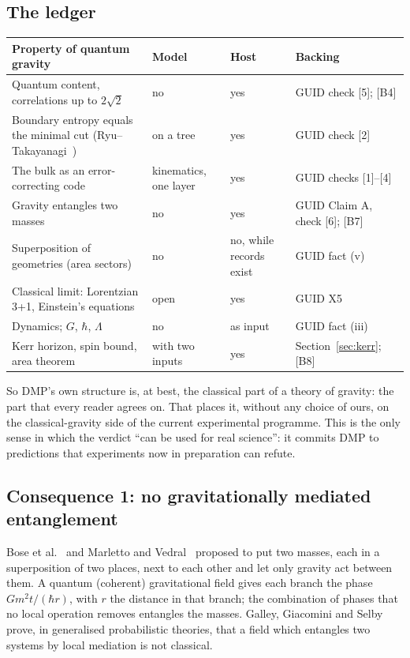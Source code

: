 \documentclass[11pt,a4paper]{article}
\theoremstyle{definition}
\theoremstyle{remark}
\newcommand{\chk}[1]{\textsf{[#1]}}
\begin{document}
\subsection{The ledger}

\begin{center}\small
\begin{tabularx}{\linewidth}{@{}LllL@{}}
\toprule
Property of quantum gravity & Model & Host & Backing \\
\midrule
Quantum content, correlations up to $2\sqrt2$ & no & yes & GUID check [5]; \chk{B4} \\
Boundary entropy equals the minimal cut (Ryu--Takayanagi~\cite{rt}) & on a tree & yes & GUID check [2] \\
The bulk as an error-correcting code~\cite{adh,happy} & kinematics, one layer & yes & GUID checks [1]--[4] \\
Gravity entangles two masses~\cite{bose,mv} & no & yes & GUID Claim A, check [6]; \chk{B7} \\
Superposition of geometries (area sectors) & no & no, while records exist & GUID fact (v) \\
Classical limit: Lorentzian 3+1, Einstein's equations & open & yes & GUID X5 \\
Dynamics; $G$, $\hbar$, $\Lambda$ & no & as input & GUID fact (iii) \\
Kerr horizon, spin bound, area theorem & with two inputs & yes & Section~\ref{sec:kerr}; \chk{B8} \\
\bottomrule
\end{tabularx}
\end{center}

\noindent So DMP's own structure is, at best, the classical part of a theory of gravity: the part that every reader agrees on. That places
it, without any choice of ours, on the classical-gravity side of the current experimental programme. This is the only sense in which the
verdict ``can be used for real science'': it commits DMP to predictions that experiments now in preparation can refute.

\subsection{Consequence 1: no gravitationally mediated entanglement}\label{sec:bmv}

Bose et al.~\cite{bose} and Marletto and Vedral~\cite{mv} proposed to put two masses, each in a superposition of two places, next to each
other and let only gravity act between them. A quantum (coherent) gravitational field gives each branch the phase $Gm^2t/(\hbar r)$, with
$r$ the distance in that branch; the combination of phases that no local operation removes entangles the masses. Galley, Giacomini and
Selby~\cite{ggs} prove, in generalised probabilistic theories, that a field which entangles two systems by local mediation is not
classical.
\end{document}
